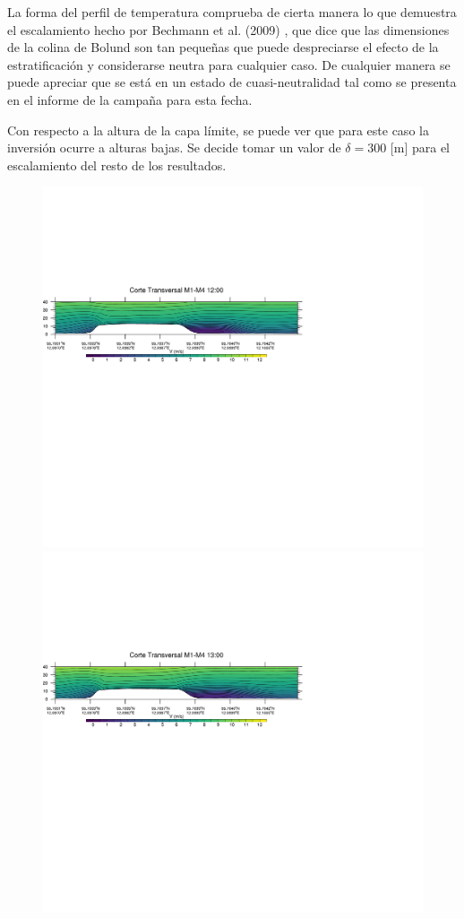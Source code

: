 La forma del perfil de temperatura comprueba de cierta manera lo que demuestra el escalamiento hecho por Bechmann et al. (2009) \cite{3d4285ac04444eb3b9775baf9af052c6}, que dice que las dimensiones de la colina de Bolund son tan pequeñas que puede despreciarse el efecto de la estratificación y considerarse neutra para cualquier caso. De cualquier manera se puede apreciar que se está en un estado de cuasi-neutralidad tal como se presenta en el informe de la campaña para esta fecha.

Con respecto a la altura de la capa límite, se puede ver que para este caso la inversión ocurre a alturas bajas. Se decide tomar un valor de $\delta = 300$ [m] para el escalamiento del resto de los resultados.
\begin{figure}[H]
	\centering
	\includegraphics[width=0.90\linewidth,trim={0mm 202.0mm 111mm 106mm},clip]{Imagenes/06/bol/1200rot}\\%
	\includegraphics[width=0.90\linewidth,trim={0mm 202.0mm 111mm 106mm},clip]{Imagenes/06/bol/1300rot}\\%

\end{figure}
